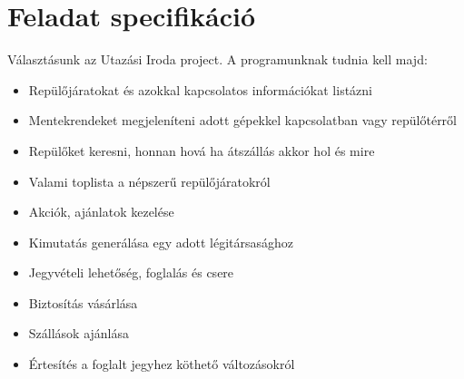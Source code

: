 \section{Feladat specifikáció}\label{sec:feladat-specifikacio}

Választásunk az Utazási Iroda project. A programunknak tudnia kell majd:
\begin{itemize}
    \item Repülőjáratokat és azokkal kapcsolatos információkat listázni
    \item Mentekrendeket megjeleníteni adott gépekkel kapcsolatban vagy repülőtérről
    \item Repülőket keresni, honnan hová ha átszállás akkor hol és mire
    \item Valami toplista a népszerű repülőjáratokról
    \item Akciók, ajánlatok kezelése
    \item Kimutatás generálása egy adott légitársasághoz
    \item Jegyvételi lehetőség, foglalás és csere
    \item Biztosítás vásárlása
    \item Szállások ajánlása
    \item Értesítés a foglalt jegyhez köthető változásokról
\end{itemize}